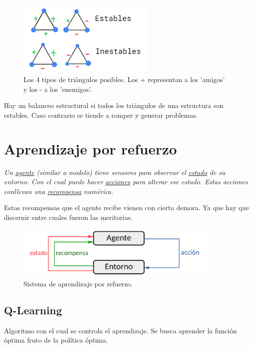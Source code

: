 \documentclass[titlepage,a4paper]{article}
\begin{document}
\begin{figure}[!htb]
    \centering
    \includegraphics[width=0.6\textwidth]{imagenesResumen/Triangulos.png}
    \caption{Los 4 tipos de triángulos posibles. Los + representan a los 'amigos' y los - a los 'enemigos'.}
    \label{triangulos}
\end{figure}


Hay un balanceo estructural si todos los triángulos de una estructura son estables. Caso contrario se tiende a romper y generar problemas.

\newpage

\section{Aprendizaje por refuerzo}
\textit{
Un \underline{agente} (similar a modelo) tiene sensores para observar el \underline{estado} de su entorno. Con el cual puede hacer \underline{acciones} para alterar ese estado. Estas acciones conllevan una \underline{recompensa} numérica.
}

Estas recompensas que el agente recibe vienen con cierta demora. Ya que hay que discernir entre cuales fueron las meritorias.

\begin{figure}[!htb]
    \centering
    \includegraphics[width=0.9\textwidth]{imagenesResumen/AprendizajeRefuerzo.PNG}
    \caption{Sistema de aprendizaje por refuerzo.}
\end{figure}


\subsection{Q-Learning}
Algoritmo con el cual se controla el aprendizaje. Se busca aprender la función óptima fruto de la política óptima.
\end{document}
